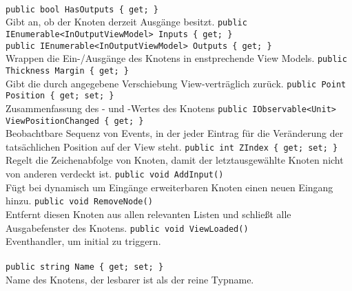 \paragraph{}
\begin{itemize}
	\add \verb!public bool HasOutputs { get; }! \\
	Gibt an, ob der Knoten derzeit Ausgänge besitzt.
	\add \verb!public IEnumerable<InOutputViewModel> Inputs { get; }! \\
	\verb!public IEnumerable<InOutputViewModel> Outputs { get; }! \\
	Wrappen die Ein-/Ausgänge des Knotens in enstprechende View Models.
	\add \verb!public Thickness Margin { get; }! \\
	Gibt die durch  angegebene Verschiebung View-verträglich zurück.
	\add \verb!public Point Position { get; set; }! \\
	Zusammenfassung des - und -Wertes des Knotens
	\add \verb!public IObservable<Unit> ViewPositionChanged { get; }! \\
	Beobachtbare Sequenz von Events, in der jeder Eintrag für die Veränderung der tatsächlichen Position auf der View steht.
	\add \verb!public int ZIndex { get; set; }! \\
	Regelt die Zeichenabfolge von Knoten, damit der letztausgewählte Knoten nicht von anderen verdeckt ist.
	\add \verb!public void AddInput()! \\
	Fügt bei dynamisch um Eingänge erweiterbaren Knoten einen neuen Eingang hinzu.
	\add \verb!public void RemoveNode()! \\
	Entfernt diesen Knoten aus allen relevanten Listen und schließt alle Ausgabefenster des Knotens.
	\add \verb!public void ViewLoaded()! \\
	Eventhandler, um  initial zu triggern.
\end{itemize}

\paragraph{}
\begin{itemize}
	\add \verb!public string Name { get; set; }! \\
	Name des Knotens, der lesbarer ist als der reine Typname.
\end{itemize}

